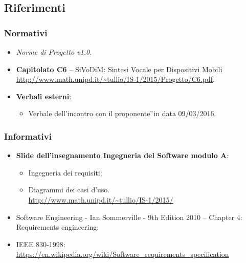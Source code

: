 \subsection{Riferimenti}

\subsubsection{Normativi}
\begin{itemize}
\item \textit{Norme di Progetto v1.0}.
\item \textbf{Capitolato C6} – SiVoDiM: Sintesi Vocale per Dispositivi Mobili\\ 
\url{http://www.math.unipd.it/~tullio/IS-1/2015/Progetto/C6.pdf}.
\item \textbf{Verbali esterni}:
\begin{itemize}
\item Verbale dell'incontro con il proponente\G\ in data 09/03/2016.
\end{itemize}
\end{itemize}

\subsubsection{Informativi}
\begin{itemize}
\item \textbf{Slide dell’insegnamento Ingegneria del Software modulo A}:
\begin{itemize}
\item Ingegneria dei requisiti;
\item Diagrammi dei casi d'uso.\\
\url{http://www.math.unipd.it/~tullio/IS-1/2015/}
\end{itemize}
\item Software Engineering - Ian Sommerville - 9th Edition 2010 – Chapter 4: Requirements engineering;
\item IEEE 830-1998: \url{ https://en.wikipedia.org/wiki/Software_requirements_specification}
\end{itemize}
